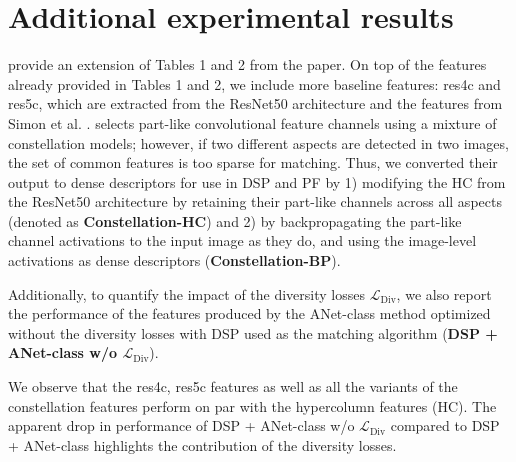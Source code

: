 \documentclass[10pt,twocolumn,letterpaper]{article}
\def\methodname{ANet\xspace}
\begin{document}
\section{Additional experimental results} provide an extension of Tables 1 and 2 from the paper. 
On top of the features already provided in Tables 1 and 2, we include more baseline features: res4c and res5c, which are extracted from the ResNet50 architecture
and the features from Simon et al. \cite{simon2015neural}. 
\cite{simon2015neural} selects part-like convolutional feature channels using a mixture of constellation models; however, if two different aspects are detected in two images, the set of common features is too sparse for matching. Thus, we converted their output to dense descriptors for use in DSP and PF by 1) modifying the HC from the ResNet50 architecture by retaining their part-like channels across all aspects (denoted as \textbf{Constellation-HC}) and 2) by backpropagating the part-like channel activations to the input image as they do, and using the image-level 
activations as dense descriptors (\textbf{Constellation-BP}).

Additionally, to quantify the impact of the diversity losses $\mathcal{L}_{\text{Div}}$, we also report the performance of the features produced by the \methodname-class method optimized without the diversity losses with DSP used as the matching algorithm (\textbf{DSP + \methodname-class w/o $\mathcal{L}_{\text{Div}}$}).

We observe that the res4c, res5c features as well as all the variants of the constellation features perform on par with the hypercolumn features (HC). 
The apparent drop in performance of DSP + \methodname-class w/o $\mathcal{L}_{\text{Div}}$ compared to DSP + \methodname-class highlights the contribution of the diversity losses.
\end{document}
